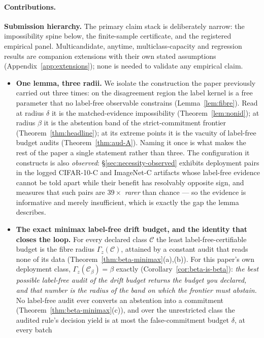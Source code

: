 \documentclass[conference]{IEEEtran}
\theoremstyle{plain}
\theoremstyle{definition}
\begin{document}
\paragraph{Contributions.}
\textbf{Submission hierarchy.} The primary claim stack is deliberately narrow: the impossibility
spine below, the finite-sample certificate, and the registered empirical panel. Multicandidate,
anytime, multiclass-capacity and regression results are companion extensions with their own stated
assumptions (Appendix~\ref{app:extensions}); none is needed to validate any empirical claim.
\begin{itemize}
\item \textbf{One lemma, three radii.} We isolate the construction the paper previously carried out
three times: on the disagreement region the label kernel is a free parameter that no label-free
observable constrains (Lemma~\ref{lem:fibre}). Read at radius $\delta$ it is the matched-evidence
impossibility (Theorem~\ref{lem:nonid}); at radius $\beta$ it is the abstention band of the
strict-commitment frontier (Theorem~\ref{thm:headline}); at its extreme points it is the vacuity of
label-free budget audits (Theorem~\ref{thm:aud-A}). Naming it once is what makes the rest of the
paper a single statement rather than three. The configuration it constructs is also
\emph{observed}: \S\ref{sec:necessity-observed} exhibits deployment pairs in the logged CIFAR-10-C
and ImageNet-C artifacts whose label-free evidence cannot be told apart while their benefit has
resolvably opposite sign, and measures that such pairs are $39\times$ \emph{rarer} than chance ---
so the evidence is informative and merely insufficient, which is exactly the gap the lemma
describes.
\item \textbf{The exact minimax label-free drift budget, and the identity that closes the loop.}
For every declared class $\mathcal C$ the least label-free-certifiable budget is the fibre radius
$\Gamma_z(\mathcal C)$, attained by a constant audit that reads none of its data
(Theorem~\ref{thm:beta-minimax}(a),(b)). For this paper's own deployment class,
$\Gamma_z(\mathcal C_\beta)=\beta$ exactly (Corollary~\ref{cor:beta-is-beta}): \emph{the best
possible label-free audit of the drift budget returns the budget you declared, and that number is
the radius of the band on which the frontier must abstain.} No label-free audit ever converts an
abstention into a commitment (Theorem~\ref{thm:beta-minimax}(c)), and over the unrestricted class
the audited rule's decision yield is at most the false-commitment budget $\delta$, at every batch

\end{itemize}
\end{document}
